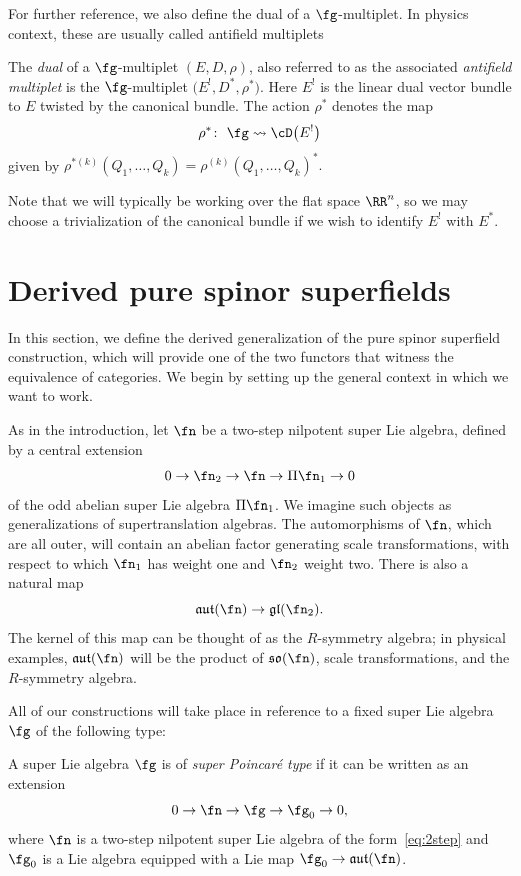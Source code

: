 \documentclass[10pt,a4paper]{amsart}
\numberwithin{equation}{section}
\def\lie#1{\ensuremath{\mathfrak{#1}}}
\def\aut{\ensuremath{\lie{aut}}}
\def\so{\lie{so}}
\begin{document}
For further reference, we also define the dual of a $\fg$-multiplet. In physics context, these are usually called antifield multiplets
\begin{dfn} \label{def: antifield}
	The \emph{dual} of a $\fg$-multiplet $(E,D,\rho)$, also referred to as the associated \emph{antifield multiplet} is the $\fg$-multiplet $\big(E^!,D^*, \rho^*\big)$. Here $E^!$ is the linear dual vector bundle to $E$ twisted by the canonical bundle. The action $\rho^*$ denotes the map
	\begin{equation*}
	\rho^* \colon \ \fg \rightsquigarrow \cD\big(E^!\big)
	\end{equation*}
	given by $\rho^{* (k)}(Q_1,\dots,Q_k) = \rho^{(k)}(Q_1,\dots, Q_k)^*.$
\end{dfn}

Note that we will typically be working over the flat space $\RR^n$, so we may choose a trivialization of the canonical bundle if we wish to identify $E^!$ with $E^*$.


\section{Derived pure spinor superfields}
In this section, we define the derived generalization of the pure spinor superfield construction, which will provide one of the two functors that witness the equivalence of categories. We begin by setting up the general context in which we want to work.

As in the introduction, let $\fn$ be a two-step nilpotent super Lie algebra, defined by a central extension
\begin{equation}\label{eq:2step}
	0 \to \fn_2 \to \fn \to \Pi \fn_1 \to 0
\end{equation}
of the odd abelian super Lie algebra $\Pi \fn_1$. We imagine such objects as generalizations of supertranslation algebras. The automorphisms of $\fn$, which are all outer, will contain an abelian factor generating scale transformations, with respect to which $\fn_1$ has weight one and $\fn_2$ weight two. There is also a natural map
\begin{equation*}
	\aut(\fn) \to \lie{gl}(\fn_2).
\end{equation*}
The kernel of this map can be thought of as the $R$-symmetry algebra; in physical examples, $\aut(\fn)$ will be the product of $\so(\fn)$, scale transformations, and the $R$-symmetry algebra.

All of our constructions will take place in reference to a fixed super Lie algebra $\fg$ of the following type:
\begin{dfn}
	A super Lie algebra $\fg$ is of \emph{super Poincar\'e type} if it can be written as an extension
	\begin{equation*}
	0 \to \fn \to \fg \to \fg_0 \to 0,
	\end{equation*}
	where $\fn$ is a two-step nilpotent super Lie algebra of the form~\eqref{eq:2step} and $\fg_0$ is a Lie algebra equipped with a Lie map $\fg_0 \to \aut(\fn)$.
\end{dfn}
\end{document}

